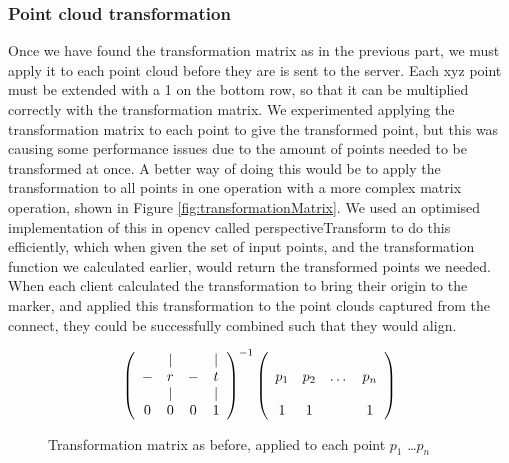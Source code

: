\documentclass{article}
\begin{document}
\subsubsection{Point cloud transformation}
Once we have found the transformation matrix as in the previous part, we must apply it to each point cloud before they are is sent to the server. Each xyz point must be extended with a 1 on the bottom row, so that it can be multiplied correctly with the transformation matrix. We experimented applying the transformation matrix to each point to give the transformed point, but this was causing some performance issues due to the amount of points needed to be transformed at once. A better way of doing this would be to apply the transformation to all points in one operation with a more complex matrix operation, shown in Figure \ref{fig:transformationMatrix}. We used an optimised implementation of this in opencv called perspectiveTransform to do this efficiently, which when given the set of input points, and the transformation function we calculated earlier, would return the transformed points we needed. When each client calculated the transformation to bring their origin to the marker, and applied this transformation to the point clouds captured from the connect, they could be successfully combined such that they would align.\\
\begin{figure}[h]
  \[\left(\begin{array}{cccc}
      & | &   & | \\
    - & r & - & t \\ 
      & | &   & | \\
    0 & 0 & 0 & 1
    \end{array}\right)^{-1}
  \left(\begin{array}{cccc}
    \multirow{3}{*}{\textbf{$p_1$}} & \multirow{3}{*}{\textbf{$p_2$}} & \multirow{3}{*}{\dots} & \multirow{3}{*}{\textbf{$p_n$}} \\
    & & & \\
    & & & \\
    1 & 1 & & 1
    \end{array}\right)\]
  \caption{Transformation matrix as before, applied to each point $p_1$ \dots $p_n$}
  \label{fig:transformationApplication}
\end{figure}
\end{document}
